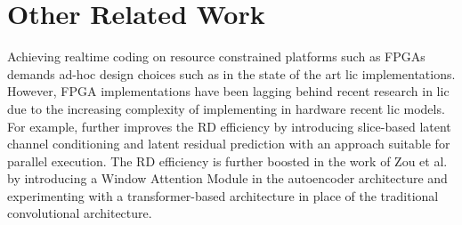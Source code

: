 \section{Other Related Work}
Achieving realtime coding on resource constrained platforms such as FPGAs demands ad-hoc design choices such as in the state of the art \acrshort{lic} implementations. However, FPGA implementations have been lagging behind recent research in \acrshort{lic} due to the increasing complexity of implementing in hardware recent \acrshort{lic} models. For example, further improves the RD efficiency by introducing slice-based latent channel conditioning and latent residual prediction with an approach suitable for parallel execution. The RD efficiency is further boosted in the work of Zou et al. \cite{zou2022devildetailswindowbasedattention} by introducing a Window Attention Module in the autoencoder architecture and experimenting with a transformer-based architecture in place of the traditional convolutional architecture.